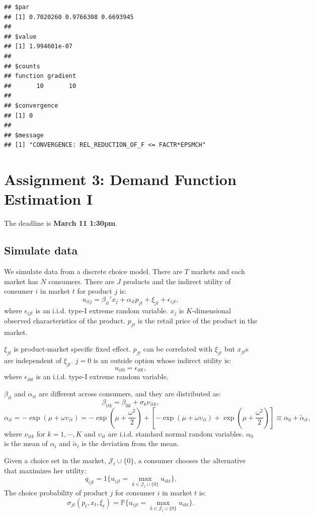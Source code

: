 \documentclass[]{book}
\begin{document}
\begin{verbatim}
## $par
## [1] 0.7020260 0.9766308 0.6693945
## 
## $value
## [1] 1.994601e-07
## 
## $counts
## function gradient 
##       10       10 
## 
## $convergence
## [1] 0
## 
## $message
## [1] "CONVERGENCE: REL_REDUCTION_OF_F <= FACTR*EPSMCH"
\end{verbatim}

\chapter{Assignment 3: Demand Function Estimation I}\label{assignment3}

The deadline is \textbf{March 11 1:30pm}.

\section{Simulate data}\label{simulate-data-2}

We simulate data from a discrete choice model. There are \(T\) markets
and each market has \(N\) consumers. There are \(J\) products and the
indirect utility of consumer \(i\) in market \(t\) for product \(j\) is:
\[
u_{itj} = \beta_{it}' x_j + \alpha_{it} p_{jt} + \xi_{jt} + \epsilon_{ijt},
\] where \(\epsilon_{ijt}\) is an i.i.d. type-I extreme random variable.
\(x_j\) is \(K\)-dimensional observed characteristics of the product.
\(p_{jt}\) is the retail price of the product in the market.

\(\xi_{jt}\) is product-market specific fixed effect. \(p_{jt}\) can be
correlated with \(\xi_{jt}\) but \(x_{jt}\)s are independent of
\(\xi_{jt}\). \(j = 0\) is an outside option whose indirect utility is:
\[
u_{it0} = \epsilon_{i0t},
\] where \(\epsilon_{i0t}\) is an i.i.d. type-I extreme random variable.

\(\beta_{it}\) and \(\alpha_{it}\) are different across consumers, and
they are distributed as: \[
\beta_{itk} = \beta_{0k} + \sigma_k \nu_{itk},
\] \[
\alpha_{it} = - \exp(\mu + \omega \upsilon_{it}) = - \exp(\mu + \frac{\omega^2}{2}) + [- \exp(\mu + \omega \upsilon_{it}) + \exp(\mu + \frac{\omega^2}{2})] \equiv \alpha_0 + \tilde{\alpha}_{it},
\] where \(\nu_{itk}\) for \(k = 1, \cdots, K\) and \(\upsilon_{it}\)
are i.i.d. standard normal random variables. \(\alpha_0\) is the mean of
\(\alpha_i\) and \(\tilde{\alpha}_i\) is the deviation from the mean.

Given a choice set in the market, \(\mathcal{J}_t \cup \{0\}\), a
consumer chooses the alternative that maximizes her utility: \[
q_{ijt} = 1\{u_{ijt} = \max_{k \in \mathcal{J}_t \cup \{0\}} u_{ikt}\}.
\] The choice probability of product \(j\) for consumer \(i\) in market
\(t\) is: \[
\sigma_{jt}(p_t, x_t, \xi_t) = \mathbb{P}\{u_{ijt} = \max_{k \in \mathcal{J}_t \cup \{0\}} u_{ikt}\}.
\]
\end{document}
